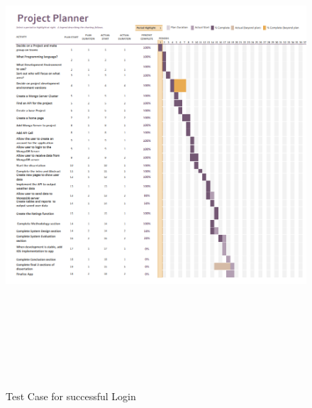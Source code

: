 \begin{figure}[H]
    \centering
    \includegraphics[width=15cm, height = 18cm]{img/Gantt.PNG}
    \caption{Test Case for successful Login}
    \label{fig:altas config}
\end{figure}

